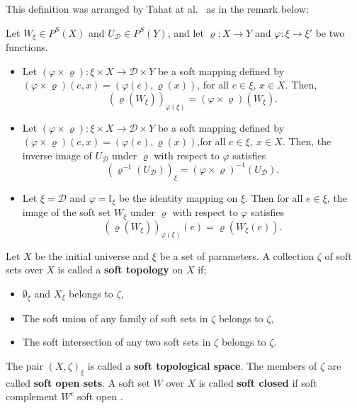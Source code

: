 \documentclass[preprint,12pt]{elsarticle}
\begin{document}
This definition was arranged by Tahat at al.~\cite{Tahat}  as in the remark below:
\begin{rem}\em{
 Let \( W_\xi  \in P^S(X) \) and \( U_{\mathscr{D}} \in P^S(Y) \), and let  \( \varrho: X \rightarrow Y \) and \( \varphi: \xi \rightarrow \xi'\) be two functions.
 \begin{itemize}
 \item[(i)]
Let \( (\varphi \times \varrho) : \xi \times X \to {\mathscr{D}} \times Y \) be a soft mapping defined by
\(
(\varphi \times \varrho)(e, x) = (\varphi(e), \varrho(x))\), for all \( e \in \xi,\, x \in X.
\)
Then,
\[
(\varrho(W_\xi))_{\varphi(\xi)} = (\varphi \times \varrho)(W_\xi).
\]
\item[(ii)]
Let \( (\varphi \times \varrho) : \xi \times X \to {\mathscr{D}} \times Y \) be a soft mapping defined by
\((\varphi \times \varrho)(e, x) = (\varphi(e), \varrho(x))\),for all \(e \in \xi,\ x \in X.\)
Then, the inverse image of \( U_{\mathscr{D}} \) under \( \varrho \) with respect to \( \varphi \) satisfies
\[
(\varrho^{-1}(U_{\mathscr{D}}))_\xi = (\varphi \times \varrho)^{-1}(U_{\mathscr{D}}).
\]

\item[(iii)]
Let \( \xi= {\mathscr{D}} \) and \( \varphi = \mathbb{I}_\xi\) be the identity mapping on \( \xi \).
Then for all \( e \in \xi \), the image of the soft set \( W_\xi \) under \( \varrho \) with respect to \( \varphi \) satisfies $$(\varrho(W_\xi))_{\varphi(\xi)}(e) = \varrho(W_\xi(e)).$$

\end{itemize}
}
\end{rem}

\begin{defn}\label{}
\em{Let $X$  be the initial universe and $\xi$ be a set of parameters. A collection $\zeta$  of soft sets over  $X$ is called a \textbf{soft topology} on \( X \) if;
\begin{itemize}
  \item  \( {\emptyset}_\xi \) and  \( X_\xi \) belongs to \( \zeta\),
  \item The soft union of any family of soft sets in \( \zeta\) belongs to \( \zeta \),
  \item The soft intersection of any two soft sets in \( \zeta\) belongs to \( \zeta \).
\end{itemize}
The pair \( (X, \zeta)_\xi \) is called a \textbf{soft topological space}. The members of
 \( \zeta \) are called  \textbf{soft open sets}.
A soft set \( W \) over  \(X\) is called \textbf{soft closed } if soft complement \( W^c \) soft open
\cite{Naz}.
}
\end{defn}
\end{document}
